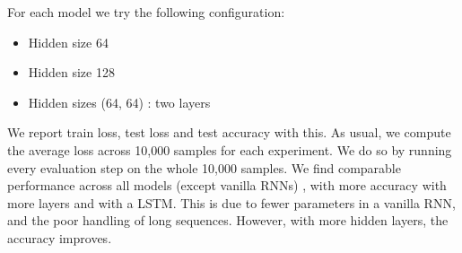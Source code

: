 For each model we try the following configuration:
\begin{itemize}
\item  Hidden size 64
\item Hidden size 128
\item Hidden sizes (64, 64) : two layers
\end{itemize}

We report train loss, test loss and test accuracy with this. As usual, we compute the average loss across 10,000 samples for each experiment. We do so by running every evaluation step on the whole 10,000 samples. We find comparable performance across all models (except vanilla RNNs) , with more accuracy with more layers and with a LSTM. This is due to fewer parameters in a vanilla RNN, and the poor handling of long sequences. However, with more hidden layers, the accuracy improves.

